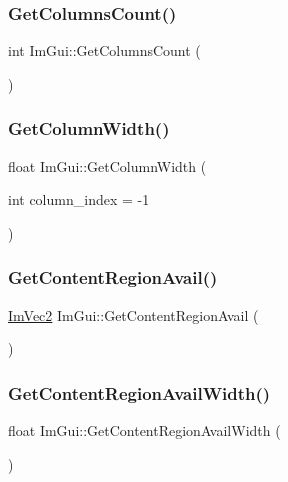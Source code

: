 \subsubsection{\texorpdfstring{Get\+Columns\+Count()}{GetColumnsCount()}}
{\footnotesize\ttfamily int Im\+Gui\+::\+Get\+Columns\+Count (\begin{DoxyParamCaption}{ }\end{DoxyParamCaption})}

\hypertarget{namespace_im_gui_a3d205d86dab5ca0763a92997283ac36e}{}\label{namespace_im_gui_a3d205d86dab5ca0763a92997283ac36e} 
\subsubsection{\texorpdfstring{Get\+Column\+Width()}{GetColumnWidth()}}
{\footnotesize\ttfamily float Im\+Gui\+::\+Get\+Column\+Width (\begin{DoxyParamCaption}\item[{int}]{column\+\_\+index = {\ttfamily -\/1} }\end{DoxyParamCaption})}

\hypertarget{namespace_im_gui_a410c8e19b2fea8b52746ca11b3930301}{}\label{namespace_im_gui_a410c8e19b2fea8b52746ca11b3930301} 
\subsubsection{\texorpdfstring{Get\+Content\+Region\+Avail()}{GetContentRegionAvail()}}
{\footnotesize\ttfamily \hyperlink{struct_im_vec2}{Im\+Vec2} Im\+Gui\+::\+Get\+Content\+Region\+Avail (\begin{DoxyParamCaption}{ }\end{DoxyParamCaption})}

\hypertarget{namespace_im_gui_a52e3311f46626a5d0369139d20da993a}{}\label{namespace_im_gui_a52e3311f46626a5d0369139d20da993a} 
\subsubsection{\texorpdfstring{Get\+Content\+Region\+Avail\+Width()}{GetContentRegionAvailWidth()}}
{\footnotesize\ttfamily float Im\+Gui\+::\+Get\+Content\+Region\+Avail\+Width (\begin{DoxyParamCaption}{ }\end{DoxyParamCaption})}

